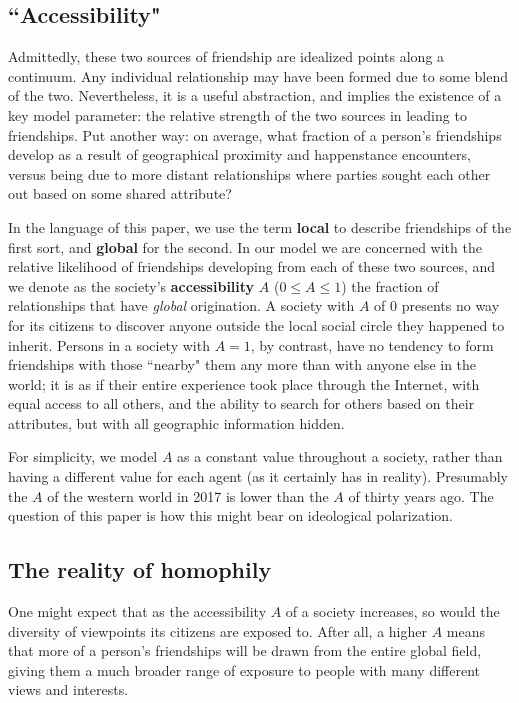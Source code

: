 \subsection{``Accessibility"}

Admittedly, these two sources of friendship are idealized points along a
continuum. Any individual relationship may have been formed due to some blend
of the two. Nevertheless, it is a useful abstraction, and implies the
existence of a key model parameter: the relative strength of the two sources
in leading to friendships. Put another way: on average, what fraction of a
person's friendships develop as a result of geographical proximity and
happenstance encounters, versus being due to more distant relationships where
parties sought each other out based on some shared attribute? 

In the language of this paper, we use the term \textbf{local} to describe
friendships of the first sort, and \textbf{global} for the second. In our
model we are concerned with the relative likelihood of friendships developing
from each of these two sources, and we denote as the society's
\textbf{accessibility} $A$ ($0 \leq A \leq 1$) the fraction of relationships
that have \textit{global} origination. A society with $A$ of 0 presents no way
for its citizens to discover anyone outside the local social circle they
happened to inherit. Persons in a society with $A=1$, by contrast, have no
tendency to form friendships with those ``nearby" them any more than with
anyone else in the world; it is as if their entire experience took place
through the Internet, with equal access to all others, and the ability to
search for others based on their attributes, but with all geographic
information hidden.

For simplicity, we model $A$ as a constant value throughout a society, rather
than having a different value for each agent (as it certainly has in reality).
Presumably the $A$ of the western world in 2017 is lower than the $A$ of
thirty years ago. The question of this paper is how this might bear on
ideological polarization.

\subsection{The reality of homophily}

One might expect that as the accessibility $A$ of a society increases, so
would the diversity of viewpoints its citizens are exposed to. After all, a
higher $A$ means that more of a person's friendships will be drawn from the
entire global field, giving them a much broader range of exposure to people
with many different views and interests.

